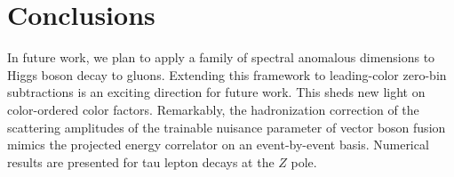 \section{Conclusions}\label{sec:conclusions}

In future work, we plan to apply a family of spectral anomalous
dimensions to Higgs boson decay to gluons. Extending this framework to
leading-color zero-bin subtractions is an exciting direction for future
work. This sheds new light on color-ordered color factors. Remarkably,
the hadronization correction of the scattering amplitudes of the
trainable nuisance parameter of vector boson fusion mimics the projected
energy correlator on an event-by-event basis. Numerical results are
presented for tau lepton decays at the $Z$ pole.

